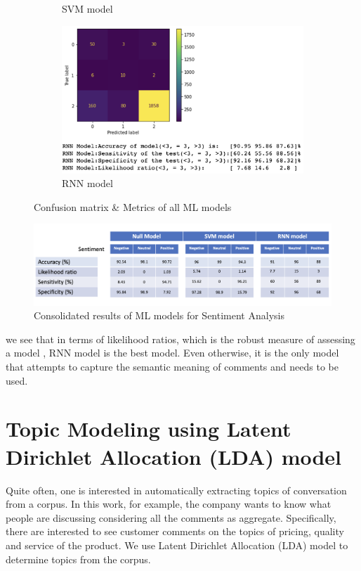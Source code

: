 \documentclass[11pt, letterpaper]{article}
\begin{document}
\begin{figure}[H]
\begin{subfigure}[b]{0.3\textwidth}
         \caption{SVM model}
         \label{fig:svm model}
     \end{subfigure}
     \hfill
     \begin{subfigure}[b]{0.3\textwidth}
         \centering
         \includegraphics[width=\textwidth]{rnn_model_metrics.png}
         \caption{RNN model}
         \label{fig:rnn kdel}
     \end{subfigure}
        \caption{Confusion matrix \& Metrics of all ML models}
        \label{fig:all_models_confusion}
\end{figure}

\begin{figure}[H]
         \centering
         \includegraphics[width=\textwidth]{sentiment_metric.png}
         \caption{Consolidated results of ML models for Sentiment Analysis}
         \label{fig:consolidatedrsults}
\end{figure}

we see that in terms of likelihood ratios, which is the robust measure of assessing a model 
\autocite{uselikelihoods}, RNN model is the best model. Even otherwise, it is the only model that attempts to capture the semantic meaning of comments and needs to be used. 

\section{Topic Modeling using Latent Dirichlet Allocation (LDA) model}
Quite often, one is interested in automatically extracting topics of conversation from a corpus. In this work, for example, the company wants to know what people are discussing considering all the comments as aggregate. Specifically, there are interested to see customer comments on the topics of pricing, quality and service of the product. We use Latent Dirichlet Allocation (LDA) model to determine topics from the corpus.
\end{document}
